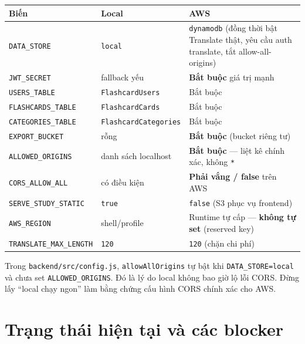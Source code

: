 \documentclass[11pt,a4paper]{article}
\newcommand{\code}[1]{\texttt{#1}}
\begin{document}
\begin{longtable}{@{}p{4.0cm} p{3.4cm} p{7.0cm}@{}}
\toprule
\textbf{Biến} & \textbf{Local} & \textbf{AWS} \\
\midrule
\endhead
\code{DATA_STORE} & \code{local} & \code{dynamodb} (đồng thời bật Translate thật, yêu cầu auth translate, tắt allow-all-origins) \\
\code{JWT_SECRET} & fallback yếu & \textbf{Bắt buộc} giá trị mạnh \\
\code{USERS_TABLE} & \code{FlashcardUsers} & Bắt buộc \\
\code{FLASHCARDS_TABLE} & \code{FlashcardCards} & Bắt buộc \\
\code{CATEGORIES_TABLE} & \code{FlashcardCategories} & Bắt buộc \\
\code{EXPORT_BUCKET} & rỗng & \textbf{Bắt buộc} (bucket riêng tư) \\
\code{ALLOWED_ORIGINS} & danh sách localhost & \textbf{Bắt buộc} — liệt kê chính xác, không \code{*} \\
\code{CORS_ALLOW_ALL} & có điều kiện & \textbf{Phải vắng / false} trên AWS \\
\code{SERVE_STUDY_STATIC} & \code{true} & \code{false} (S3 phục vụ frontend) \\
\code{AWS_REGION} & shell/profile & Runtime tự cấp — \textbf{không tự set} (reserved key) \\
\code{TRANSLATE_MAX_LENGTH} & \code{120} & \code{120} (chặn chi phí) \\
\bottomrule
\end{longtable}

\begin{note}
Trong \code{backend/src/config.js}, \code{allowAllOrigins} tự bật khi \code{DATA_STORE=local} và
chưa set \code{ALLOWED_ORIGINS}. Đó là lý do local không bao giờ lộ lỗi CORS. Đừng lấy ``local
chạy ngon'' làm bằng chứng cấu hình CORS chính xác cho AWS.
\end{note}

\section{Trạng thái hiện tại và các blocker}
\end{document}
